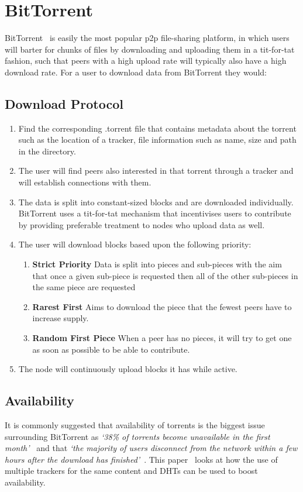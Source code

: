 
\section{BitTorrent}

BitTorrent~\cite{kaune_unraveling_2010,pouwelse_bittorrent_2005} is easily the most popular p2p file-sharing platform, in which users will barter for chunks of files by downloading and uploading them in a tit-for-tat fashion, such that peers with a high upload rate will typically also have a high download rate. For a user to download data from BitTorrent they would:

\subsection{Download Protocol}

\begin{enumerate}
  \item Find the corresponding .torrent file that contains metadata about the torrent such as the location of a tracker, file information such as name, size and path in the directory.
  \item The user will find peers also interested in that torrent through a tracker and will establish connections with them.
  \item The data is split into constant-sized blocks and are downloaded individually. BitTorrent uses a tit-for-tat mechanism that incentivises users to contribute by providing preferable treatment to nodes who upload data as well.
  \item The user will download blocks based upon the following priority:
        \begin{enumerate}
          \item \textbf{Strict Priority} Data is split into pieces and sub-pieces with the aim that once a given sub-piece is requested then all of the other sub-pieces in the same piece are requested
          \item \textbf{Rarest First} Aims to download the piece that the fewest peers have to increase supply.
          \item \textbf{Random First Piece} When a peer has no pieces, it will try to get one as soon as possible to be able to contribute.
        \end{enumerate}
  \item The node will continuously upload blocks it has while active.
\end{enumerate}

\subsection{Availability}

It is commonly suggested that availability of torrents is the biggest issue surrounding BitTorrent as \textit{`38\% of torrents become unavailable in the first month'}~\cite{kaune_unraveling_2010} and that \textit{`the majority of users disconnect from the network within a few hours after the download has finished'}~\cite{pouwelse_bittorrent_2005}.
This paper~\cite{neglia_availability_2007} looks at how the use of multiple trackers for the same content and DHTs can be used to boost availability.

